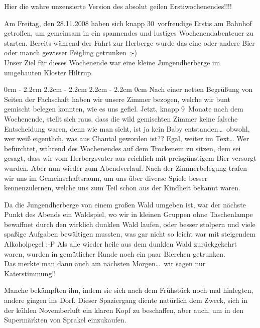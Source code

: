 \begin{multicols}{2}
Hier die wahre unzensierte Version des absolut geilen Erstiwochenendes!!!!

Am Freitag, den 28.11.2008 haben sich knapp 30~vorfreudige Erstis am Bahnhof getroffen, um gemeinsam in ein spannendes und lustiges Wochenendabenteuer zu starten. Bereits während der Fahrt zur Herberge wurde das eine oder andere Bier oder manch gewisser Feigling getrunken~;-)\\
Unser Ziel für dieses Wochenende war eine kleine Jungendherberge im umgebauten Kloster Hiltrup.

0cm \columnwidth
0cm \columnwidth
0cm \columnwidth
0cm \columnwidth
0cm \columnwidth
0cm \columnwidth
0cm \columnwidth
0cm \columnwidth
0cm \columnwidth
0cm \columnwidth
0cm \columnwidth
0cm \columnwidth
2.2cm \dimexpr\columnwidth - 2.2cm
2.2cm \dimexpr\columnwidth - 2.2cm
2.2cm \dimexpr\columnwidth - 2.2cm
0cm \columnwidth
Nach einer netten Begrüßung von Seiten der Fachschaft haben wir unsere Zimmer bezogen, welche wir bunt gemischt belegen konnten, wie es uns gefiel. Jetzt, knapp 9~Monate nach dem Wochenende, stellt sich raus, dass die wild gemischten Zimmer keine falsche Entscheidung waren, denn wie man sieht, ist ja kein Baby entstanden\dots\ obwohl, wer weiß eigentlich, was aus Chantal geworden ist?? Egal, weiter im Text{\dots} Wer befürchtet, während des Wochenendes auf dem Trockenem zu sitzen, dem sei gesagt, dass wir vom Herbergsvater aus reichlich mit preisgünstigem Bier versorgt wurden. Aber nun wieder zum Abendverlauf. Nach der Zimmerbelegung trafen wir uns im Gemeinschaftsraum, um uns über diverse Spiele besser kennenzulernen, welche uns zum Teil schon aus der Kindheit bekannt waren.

Da die Jungendherberge von einem großen Wald umgeben ist, war der nächste Punkt des Abends ein Waldspiel, wo wir in kleinen Gruppen ohne Taschenlampe bewaffnet durch den wirklich dunklen Wald laufen, oder besser stolpern und viele spaßige Aufgaben bewältigen mussten, was gar nicht so leicht war mit steigendem Alkoholpegel :-P Als alle wieder heile aus dem dunklen Wald zurückgekehrt waren, wurden in gemütlicher Runde noch ein paar Bierchen getrunken.\\
Das merkte man dann auch am nächsten Morgen\dots\ wir sagen nur Katerstimmung!!

\begin{center}
\end{center}

Manche bekämpften ihn, indem sie sich nach dem Frühstück noch mal hinlegten, andere gingen ins Dorf. Dieser Spaziergang diente natürlich dem Zweck, sich in der kühlen Novemberluft ein klaren Kopf zu beschaffen, aber auch, um in den Supermärkten von Sprakel einzukaufen.


\end{multicols}
